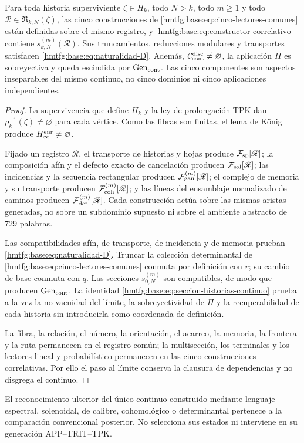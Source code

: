 \begin{theorem}
\label{hmtfg:base:thm:correlacion-cinco}
Para toda historia superviviente \(\zeta\in H_k\), todo \(N>k\), todo
\(m\geq1\) y todo \(\mathscr R\in\mathfrak R_{k,N}(\zeta)\), las cinco
construcciones de \eqref{hmtfg:base:eq:cinco-lectores-comunes} están definidas sobre el
mismo registro, y \eqref{hmtfg:base:eq:constructor-correlativo} contiene
\(s_{k,N}^{(m)}(\mathscr R)\). Sus truncamientos, reducciones modulares y
transportes satisfacen \eqref{hmtfg:base:eq:naturalidad-D}. Además,
\(\mathcal C_{\rm cont}^{\rm disc}\neq\varnothing\), la aplicación \(\Pi\)
es sobreyectiva y queda escindida por \(\operatorname{Gen}_{\rm cont}\). Las
cinco componentes son aspectos inseparables del mismo continuo, no cinco
dominios ni cinco aplicaciones independientes.
\end{theorem}

\begin{proof}
La supervivencia que define \(H_k\) y la ley de prolongación TPK dan
\(\rho_k^{-1}(\zeta)\neq\varnothing\) para cada vértice. Como las fibras son
finitas, el lema de Kőnig produce \(H_\infty^{\rm enr}\neq\varnothing\).

Fijado un registro \(\mathscr R\), el transporte de historias y hojas produce
\(\mathcal F_{\rm sp}[\mathscr R]\); la composición afín y el defecto exacto
de cancelación producen \(\mathcal F_{\rm sol}[\mathscr R]\); las incidencias
y la secuencia rectangular producen \(\mathcal F_{\rm gau}^{(m)}[\mathscr R]\);
el complejo de memoria y su transporte producen
\(\mathcal F_{\rm coh}^{(m)}[\mathscr R]\); y las líneas del ensamblaje
normalizado de caminos producen \(\mathcal F_{\rm det}^{(m)}[\mathscr R]\).
Cada construcción actúa sobre las mismas aristas generadas, no sobre un
subdominio supuesto ni sobre el ambiente abstracto de \(729\) palabras.

Las compatibilidades afín, de transporte, de incidencia y de memoria prueban
\eqref{hmtfg:base:eq:naturalidad-D}. Truncar la colección determinantal de
\eqref{hmtfg:base:eq:cinco-lectores-comunes} conmuta por
definición con \(r\); su cambio de base conmuta con \(q\). Las secciones
\(s_{0,N}^{(m)}\) son compatibles, de modo que producen
\(\operatorname{Gen}_{\rm cont}\). La identidad
\eqref{hmtfg:base:eq:seccion-historias-continuo} prueba a la vez la no
vacuidad del límite, la sobreyectividad de \(\Pi\) y la recuperabilidad de cada
historia sin introducirla como coordenada de definición.

La fibra, la relación, el número, la orientación, el acarreo, la memoria, la
frontera y la ruta permanecen en el registro común; la multisección, los
terminales y los lectores lineal y probabilístico permanecen en las cinco
construcciones correlativas. Por ello el paso al límite conserva la clausura de
dependencias y no disgrega el continuo.
\end{proof}

El reconocimiento ulterior del único continuo construido mediante lenguaje
espectral, solenoidal, de calibre, cohomológico o determinantal pertenece a la
comparación convencional posterior. No selecciona sus estados ni interviene en
su generación APP--TRIT--TPK.
